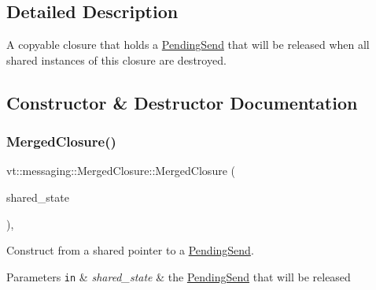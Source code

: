 \subsection{Detailed Description}
A copyable closure that holds a {\ttfamily \hyperlink{structvt_1_1messaging_1_1_pending_send}{Pending\+Send}} that will be released when all shared instances of this closure are destroyed. 

\subsection{Constructor \& Destructor Documentation}
\mbox{\label{structvt_1_1messaging_1_1_merged_closure_aa860c8bc95d88534a9f8a6b733e377c9}} 
\subsubsection{\texorpdfstring{Merged\+Closure()}{MergedClosure()}\hspace{0.1cm}{\footnotesize\ttfamily [1/3]}}
{\footnotesize\ttfamily vt\+::messaging\+::\+Merged\+Closure\+::\+Merged\+Closure (\begin{DoxyParamCaption}\item[{std\+::shared\+\_\+ptr$<$ \hyperlink{structvt_1_1messaging_1_1_pending_send}{Pending\+Send} $>$}]{shared\+\_\+state }\end{DoxyParamCaption})\hspace{0.3cm}{\ttfamily [inline]}, {\ttfamily [explicit]}}



Construct from a shared pointer to a {\ttfamily \hyperlink{structvt_1_1messaging_1_1_pending_send}{Pending\+Send}}. 


\begin{DoxyParams}[1]{Parameters}
\mbox{\tt in}  & {\em shared\+\_\+state} & the {\ttfamily \hyperlink{structvt_1_1messaging_1_1_pending_send}{Pending\+Send}} that will be released \\
\hline
\end{DoxyParams}
\mbox{\label{structvt_1_1messaging_1_1_merged_closure_ab21e88def46380f5e1b70cf4211cd511}} 
